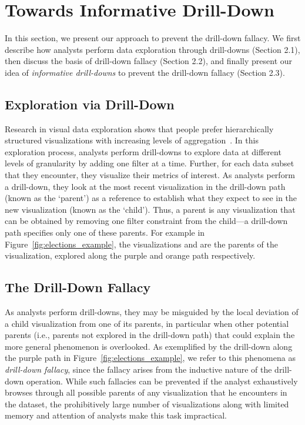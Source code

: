 
\section{Towards Informative Drill-Down\label{sec:datamodel}}
\par In this section, we present our approach to prevent the drill-down fallacy. We first describe how analysts perform data exploration through drill-downs (Section 2.1), then discuss the basis of drill-down fallacy (Section 2.2), and finally present our idea of \emph{informative drill-downs} to prevent the drill-down fallacy (Section 2.3).

\subsection{Exploration via Drill-Down}
Research in visual data exploration shows that people prefer hierarchically structured visualizations with increasing levels of aggregation~\cite{Kim2017,Hullman2017,Hullman2013}. In this exploration process, analysts perform drill-downs to explore data at different levels of granularity by adding one filter at a time. Further, for each data subset that they encounter, they visualize their metrics of interest. As analysts perform a drill-down, they look at the most recent visualization in the drill-down path (known as the `parent') as a reference to establish what they expect to see in the new visualization (known as the `child'). Thus, a parent is any visualization that can be obtained by removing one filter constraint from the child---a drill-down path specifies only one of these parents. For example in Figure~\ref{fig:elections_example}, the visualizations  and  are the parents of the  visualization, explored along the purple and orange path respectively. 

\subsection{The Drill-Down Fallacy}
As analysts perform drill-downs, they may be misguided by the local deviation of a child visualization from one of its parents, in particular when other potential parents (i.e., parents not explored in the drill-down path) that could explain the more general phenomenon is overlooked. As exemplified by the drill-down along the purple path in Figure~\ref{fig:elections_example}, we refer to this phenomena as \emph{drill-down fallacy}, since the fallacy arises from the inductive nature of the drill-down operation. While such fallacies can be prevented if the analyst exhaustively browses through all possible parents of any visualization that he encounters in the dataset, the prohibitively large number of visualizations along with limited memory and attention of analysts make this task impractical.

